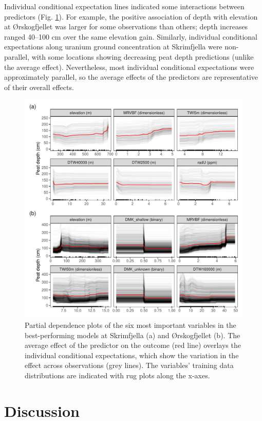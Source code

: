 \documentclass[soil, manuscript]{copernicus}
\begin{document}
Individual conditional expectation lines indicated some interactions between predictors (Fig. \ref{fig:pdps}).
For example, the positive association of depth with elevation at Ørskogfjellet was larger for some observations than others; depth increases ranged 40--100 cm over the same elevation gain.
Similarly, individual conditional expectations along uranium ground concentration at Skrimfjella were non-parallel, with some locations showing decreasing peat depth predictions (unlike the average effect).
Nevertheless, most individual conditional expectations were approximately parallel, so the average effects of the predictors are representative of their overall effects.

\begin{figure}
\includegraphics[width=1\linewidth]{figures/partial_dependence} \caption{Partial dependence plots of the six most important variables in the best-performing models at Skrimfjella (a) and Ørskogfjellet (b). The average effect of the predictor on the outcome (red line) overlays the individual conditional expectations, which show the variation in the effect across observations (grey lines). The variables' training data distributions are indicated with rug plots along the x-axes.}\label{fig:pdps}
\end{figure}

\section{Discussion}
\end{document}
